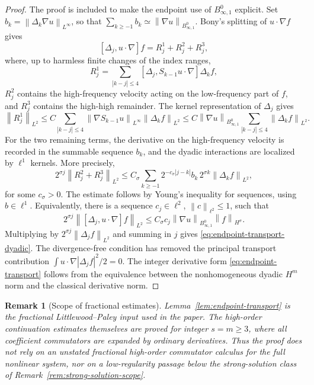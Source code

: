 \documentclass[11pt]{article}
\newtheorem{remark}{Remark}[section]
\newcommand{\norm}[1]{\left\lVert #1\right\rVert}
\begin{document}
\begin{proof}
The proof is included to make the endpoint use of \(B^0_{\infty,1}\) explicit.
Set \(b_k=\norm{\Delta_k\nabla u}_{L^\infty}\), so that
\(\sum_{k\ge-1}b_k\simeq\norm{\nabla u}_{B^0_{\infty,1}}\).  Bony's
splitting of \(u\cdot\nabla f\) gives
\[
  [\Delta_j,u\cdot\nabla]f
  =R_j^1+R_j^2+R_j^3,
\]
where, up to harmless finite changes of the index ranges,
\[
  R_j^1=\sum_{|k-j|\le4}
  [\Delta_j,S_{k-1}u\cdot\nabla]\Delta_k f,
\]
\(R_j^2\) contains the high-frequency velocity acting on the low-frequency
part of \(f\), and \(R_j^3\) contains the high-high remainder.  The kernel
representation of \(\Delta_j\) gives
\[
  \norm{R_j^1}_{L^2}
  \le C\sum_{|k-j|\le4}
  \norm{\nabla S_{k-1}u}_{L^\infty}\norm{\Delta_k f}_{L^2}
  \le C\norm{\nabla u}_{B^0_{\infty,1}}
  \sum_{|k-j|\le4}\norm{\Delta_k f}_{L^2}.
\]
For the two remaining terms, the derivative on the high-frequency velocity is
recorded in the summable sequence \(b_k\), and the dyadic interactions are
localized by \(\ell^1\) kernels.  More precisely,
\[
  2^{\sigma j}\norm{R_j^2+R_j^3}_{L^2}
  \le C_\sigma
  \sum_{k\ge-1}2^{-c_\sigma|j-k|}
  b_k\,2^{\sigma k}\norm{\Delta_k f}_{L^2},
  \label{eq:lp-commutator-kernel}
\]
for some \(c_\sigma>0\).  The estimate follows by Young's inequality for
sequences, using \(b\in\ell^1\).  Equivalently, there is a sequence
\(c_j\in\ell^2\), \(\norm{c}_{\ell^2}\le1\), such that
\[
  2^{\sigma j}\norm{[\Delta_j,u\cdot\nabla]f}_{L^2}
  \le C_\sigma c_j
  \norm{\nabla u}_{B^0_{\infty,1}}\norm{f}_{H^\sigma}.
\]
Multiplying by \(2^{\sigma j}\norm{\Delta_j f}_{L^2}\) and summing in
\(j\) gives \eqref{eq:endpoint-transport-dyadic}.  The divergence-free
condition has removed the principal transport contribution
\(\int u\cdot\nabla |\Delta_j f|^2/2=0\).  The integer derivative form
\eqref{eq:endpoint-transport} follows from the equivalence between the
nonhomogeneous dyadic \(H^m\) norm and the classical derivative norm.
\end{proof}

\begin{remark}[Scope of fractional estimates]
\label{rem:fractional-scope}
Lemma~\ref{lem:endpoint-transport} is the fractional Littlewood--Paley input
used in the paper.  The high-order continuation estimates themselves are
proved for integer \(s=m\ge3\), where all coefficient commutators are
expanded by ordinary derivatives.  Thus the proof does not rely on an unstated
fractional high-order commutator calculus for the full nonlinear system, nor on
a low-regularity passage below the strong-solution class of
Remark~\ref{rem:strong-solution-scope}.
\end{remark}
\end{document}
